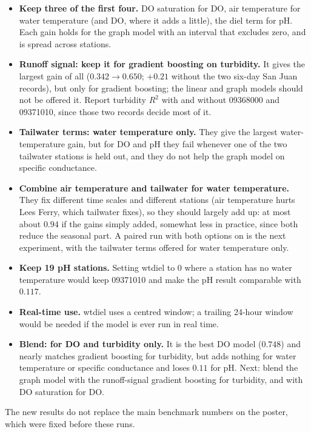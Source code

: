 \documentclass[11pt]{article}
\newcommand{\codeus}{\textunderscore\allowbreak}
\newcommand{\code}[1]{{\ttfamily\let\_\codeus #1}}
\begin{document}
\begin{itemize}
  \item \textbf{Keep three of the first four.} DO saturation for DO, air temperature for water
        temperature (and DO, where it adds a little), the diel term for pH. Each gain holds for
        the graph model with an interval that excludes zero, and is spread across stations.
  \item \textbf{Runoff signal: keep it for gradient boosting on turbidity.} It gives the largest
        gain of all ($0.342\to0.650$; $+0.21$ without the two six-day San Juan records), but
        only for gradient boosting; the linear and graph models should not be offered it. Report
        turbidity $R^2$ with and without 09368000 and 09371010, since those two records decide
        most of it.
  \item \textbf{Tailwater terms: water temperature only.} They give the largest water-temperature
        gain, but for DO and pH they fail whenever one of the two tailwater stations is held
        out, and they do not help the graph model on specific conductance.
  \item \textbf{Combine air temperature and tailwater for water temperature.} They fix different
        time scales and different stations (air temperature hurts Lees Ferry, which tailwater
        fixes), so they should largely add up: at most about $0.94$ if the gains simply added, somewhat
        less in practice, since both reduce the seasonal part. A paired
        run with both options on is the next experiment, with the tailwater terms offered for
        water temperature only.
  \item \textbf{Keep 19 pH stations.} Setting \code{wt\_diel} to $0$ where a station has no water
        temperature would keep 09371010 and make the pH result comparable with $0.117$.
  \item \textbf{Real-time use.} \code{wt\_diel} uses a centred window; a trailing 24-hour window
        would be needed if the model is ever run in real time.
  \item \textbf{Blend: for DO and turbidity only.} It is the best DO model ($0.748$) and
        nearly matches gradient boosting for turbidity, but adds nothing for water temperature or
        specific conductance and loses $0.11$ for pH. Next: blend the graph model with the
        runoff-signal gradient boosting for turbidity, and with DO saturation for DO.
\end{itemize}

The new results do not replace the main benchmark numbers on the poster, which were fixed before
these runs.
\end{document}
